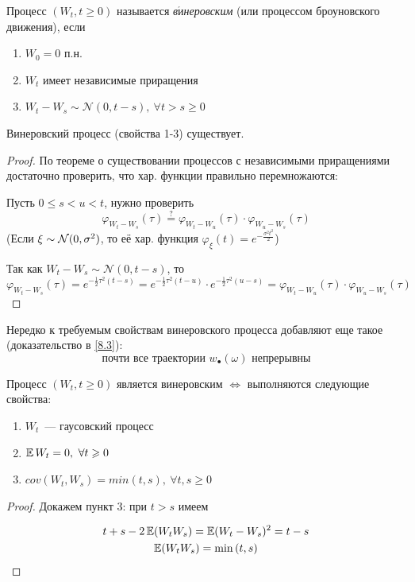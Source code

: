 \begin{definition}
    Процесс $(W_t, t \geq 0)$ называется \textit{в$\acute{\text{и}}$неровским} (или процессом броуновского движения), если 
    \begin{enumerate}
        \item $W_0 = 0$ п.н.
        \item $W_t$ имеет независимые приращения
        \item $W_t - W_s \sim \mathcal{N}(0, t-s), \ \forall t > s \geq 0$
    \end{enumerate}
\end{definition}


\begin{statement}
Винеровский процесс (свойства 1-3) существует.
\end{statement}

\begin{proof}
По теореме о существовании процессов с независимыми приращениями достаточно проверить, что хар. функции правильно перемножаются:

Пусть $0 \leq s < u < t$, нужно проверить
$$
\varphi_{W_t - W_s}(\tau) \stackrel{?}{=} \varphi_{W_t - W_u}(\tau) \cdot \varphi_{W_u - W_s}(\tau)
$$
(Если $\xi \sim \mathcal{N}(0, \sigma^2)$, то её хар. функция $\varphi_\xi(t) = e^{-\frac{\sigma^2 t^2}{2}}$)

Так как $W_t - W_s \sim \mathcal{N}(0, t-s)$, то
$$
\varphi_{W_t - W_s}(\tau) = e^{- \frac{1}{2} \tau^2 (t-s)} = e^{- \frac{1}{2} \tau^2 (t-u)} \cdot e^{- \frac{1}{2} \tau^2 (u-s)} = \varphi_{W_t - W_u}(\tau) \cdot \varphi_{W_u - W_s}(\tau)
$$
\end{proof}

\begin{note}
    Нередко к требуемым свойствам винеровского процесса добавляют еще такое (доказательство в \ref{8.3}):
    \begin{equation*}
        \text{почти все траектории } w_{\bullet}(\omega) \text{ непрерывны}
    \end{equation*}
\end{note}

\begin{theorem}
    Процесс $(W_t, t \geq 0)$ является винеровским $\Longleftrightarrow$ выполняются следующие свойства:
    \begin{enumerate}
        \item $W_t$~--- гаусовский процесс
        \item $\operatorname{\mathbb{E}} W_t = 0, \ \forall t \geqslant 0$
        \item $cov(W_t, W_s) = min(t,s), \ \forall t, s \geq 0$
    \end{enumerate}
\end{theorem}

\begin{proof}
    Докажем пункт 3: при $t>s$ имеем

    \begin{gather*}
        t + s - 2 \operatorname{\mathbb{E}} (W_tW_s) = \operatorname{\mathbb{E}} (W_t - W_s)^2 = t - s \\
        \operatorname{\mathbb{E}} (W_tW_s) = \min{(t, s)}
    \end{gather*}
\end{proof}
